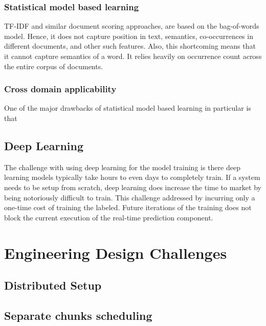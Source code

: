 \documentclass[conference]{IEEEtran}
\begin{document}
        \subsubsection{Statistical model based learning}
            TF-IDF and similar document scoring approaches, are based on the bag-of-words model. Hence, it does not capture position in text, semantics, co-occurrences in different documents, and other such features. Also, this shortcoming means that it cannot capture semantics of a word. It relies heavily on occurrence count across the entire corpus of documents.

        \subsubsection{Cross domain applicability}
            One of the major drawbacks of statistical model based learning in particular is that 

    \subsection{Deep Learning}
        The challenge with using deep learning for the model training is there deep learning models typically take hours to even days to completely train. If a system needs to be setup from scratch, deep learning does increase the time to market by being notoriously difficult to train. This challenge addressed by incurring only a one-time cost of training the labeled. Future iterations of the training does not block the current execution of the real-time prediction component.

\vspace{5mm}

\section{Engineering Design Challenges}
    
    \subsection{Distributed Setup}

    \subsection{Separate chunks scheduling}
\end{document}
